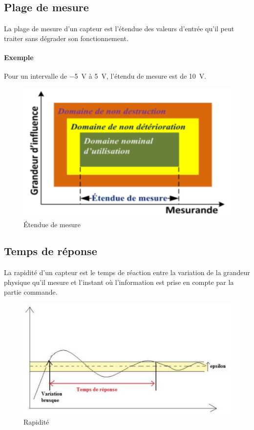 \documentclass{article}
\begin{document}
        \subsection{Plage de mesure}
        \paragraph{}
        La plage de mesure d'un capteur est l'étendue des valeurs d'entrée qu'il peut traiter sans dégrader son fonctionnement.

        \paragraph{Exemple}
        Pour un intervalle de \SI{-5}{\volt} à \SI{+5}{\volt}, l'étendu de mesure est de \SI{10}{\volt}.

        \begin{figure}[H]
            \centering
            \includegraphics[width=0.4\linewidth]{./images/006-etendue-de-mesure.png}
            \caption{Étendue de mesure}
        \end{figure}
        
        \subsection{Temps de réponse}
        \paragraph{}
        La rapidité d'un capteur est le temps de réaction entre la variation de la grandeur physique qu'il mesure et l'instant où l'information est prise en compte par la partie commande.

        \begin{figure}[H]
            \centering
            \includegraphics[width=0.5\linewidth]{./images/007-rapidite.png}
            \caption{Rapidité}
        \end{figure}
\end{document}
